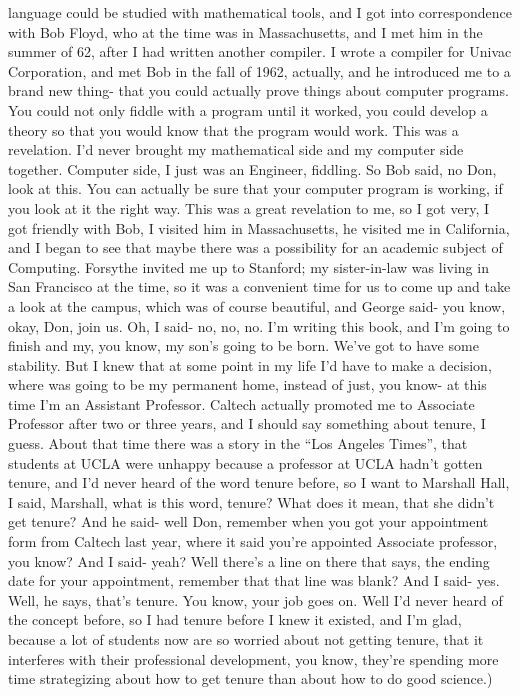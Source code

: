 \documentclass[]{article}
\begin{document}
language could be studied with mathematical tools, and I got into
correspondence with Bob Floyd, who at the time was in Massachusetts, and
I met him in the summer of 62, after I had written another compiler. I
wrote a compiler for Univac Corporation, and met Bob in the fall of
1962, actually, and he introduced me to a brand new thing- that you
could actually prove things about computer programs. You could not only
fiddle with a program until it worked, you could develop a theory so
that you would know that the program would work. This was a revelation.
I'd never brought my mathematical side and my computer side together.
Computer side, I just was an Engineer, fiddling. So Bob said, no Don,
look at this. You can actually be sure that your computer program is
working, if you look at it the right way. This was a great revelation to
me, so I got very, I got friendly with Bob, I visited him in
Massachusetts, he visited me in California, and I began to see that
maybe there was a possibility for an academic subject of Computing.
Forsythe invited me up to Stanford; my sister-in-law was living in San
Francisco at the time, so it was a convenient time for us to come up and
take a look at the campus, which was of course beautiful, and George
said- you know, okay, Don, join us. Oh, I said- no, no, no. I'm writing
this book, and I'm going to finish and my, you know, my son's going to
be born. We've got to have some stability. But I knew that at some point
in my life I'd have to make a decision, where was going to be my
permanent home, instead of just, you know- at this time I'm an Assistant
Professor. Caltech actually promoted me to Associate Professor after two
or three years, and I should say something about tenure, I guess. About
that time there was a story in the ``Los Angeles Times'', that students
at UCLA were unhappy because a professor at UCLA hadn't gotten tenure,
and I'd never heard of the word tenure before, so I want to Marshall
Hall, I said, Marshall, what is this word, tenure? What does it mean,
that she didn't get tenure? And he said- well Don, remember when you got
your appointment form from Caltech last year, where it said you're
appointed Associate professor, you know? And I said- yeah? Well there's
a line on there that says, the ending date for your appointment,
remember that that line was blank? And I said- yes. Well, he says,
that's tenure. You know, your job goes on. Well I'd never heard of the
concept before, so I had tenure before I knew it existed, and I'm glad,
because a lot of students now are so worried about not getting tenure,
that it interferes with their professional development, you know,
they're spending more time strategizing about how to get tenure than
about how to do good science.)
\end{document}
